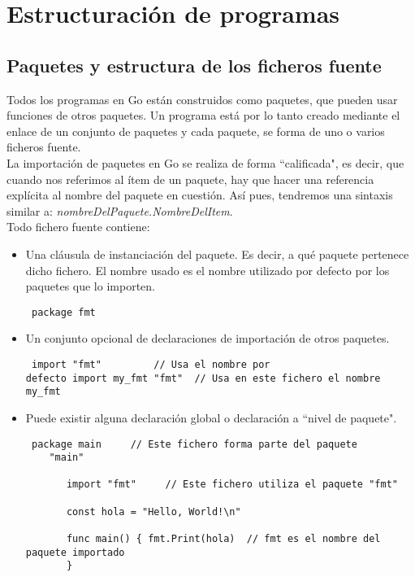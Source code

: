
\chapter{Estructuración de programas}

\section{Paquetes y estructura de los ficheros fuente}

Todos los programas en Go están construidos como paquetes, que pueden usar
funciones de otros paquetes. Un programa está por lo tanto creado mediante el
enlace de un conjunto de paquetes y cada paquete, se forma de uno o varios
ficheros fuente.\\

La importación de paquetes en Go se realiza de forma ``calificada", es decir,
que cuando nos referimos al ítem de un paquete, hay que hacer una referencia
explícita al nombre del paquete en cuestión. Así pues, tendremos una sintaxis
similar a: \textit{nombreDelPaquete.NombreDelItem}.\\

Todo fichero fuente contiene:

\begin{itemize} \item Una cláusula de instanciación del paquete. Es decir, a qué
paquete pertenece dicho fichero. El nombre usado es el nombre utilizado por
defecto por los paquetes que lo importen.  \begin{verbatim} package fmt
\end{verbatim} \item Un conjunto opcional de declaraciones de importación de
otros paquetes.  \begin{verbatim} import "fmt"         // Usa el nombre por
defecto import my_fmt "fmt"  // Usa en este fichero el nombre my_fmt
\end{verbatim} \item Puede existir alguna declaración global o declaración
a ``nivel de paquete".
	\begin{verbatim} package main     // Este fichero forma parte del paquete
	"main"
    
	   import "fmt"     // Este fichero utiliza el paquete "fmt"
    
	   const hola = "Hello, World!\n"
    
	   func main() { fmt.Print(hola)  // fmt es el nombre del paquete importado
	   } \end{verbatim}
\end{itemize}



